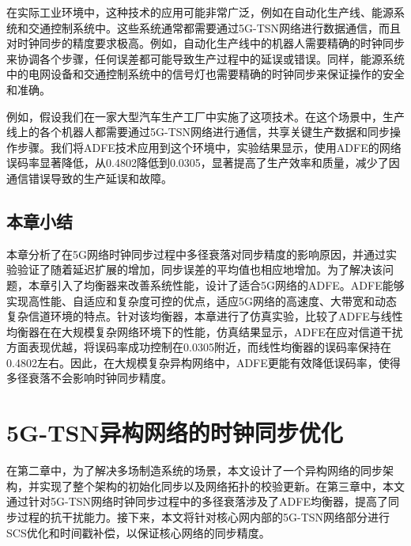 \documentclass[UTF8,a4paper,12pt]{ctexart}
\numberwithin{equation}{section}
\begin{document}
在实际工业环境中，这种技术的应用可能非常广泛，例如在自动化生产线、能源系统和交通控制系统中。这些系统通常都需要通过5G-TSN网络进行数据通信，而且对时钟同步的精度要求极高。例如，自动化生产线中的机器人需要精确的时钟同步来协调各个步骤，任何误差都可能导致生产过程中的延误或错误。同样，能源系统中的电网设备和交通控制系统中的信号灯也需要精确的时钟同步来保证操作的安全和准确。

例如，假设我们在一家大型汽车生产工厂中实施了这项技术。在这个场景中，生产线上的各个机器人都需要通过5G-TSN网络进行通信，共享关键生产数据和同步操作步骤。我们将ADFE技术应用到这个环境中，实验结果显示，使用ADFE的网络误码率显著降低，从0.4802降低到0.0305，显著提高了生产效率和质量，减少了因通信错误导致的生产延误和故障。


\subsection{本章小结}
本章分析了在5G网络时钟同步过程中多径衰落对同步精度的影响原因，并通过实验验证了随着延迟扩展的增加，同步误差的平均值也相应地增加。为了解决该问题，本章引入了均衡器来改善系统性能，设计了适合5G网络的ADFE。ADFE能够实现高性能、自适应和复杂度可控的优点，适应5G网络的高速度、大带宽和动态复杂信道环境的特点。针对该均衡器，本章进行了仿真实验，比较了ADFE与线性均衡器在在大规模复杂网络环境下的性能，仿真结果显示，ADFE在应对信道干扰方面表现优越，将误码率成功控制在0.0305附近，而线性均衡器的误码率保持在0.4802左右。因此，在大规模复杂异构网络中，ADFE更能有效降低误码率，使得多径衰落不会影响时钟同步精度。
\newpage
{}
\section{5G-TSN异构网络的时钟同步优化}
在第二章中，为了解决多场制造系统的场景，本文设计了一个异构网络的同步架构，并实现了整个架构的初始化同步以及网络拓扑的校验更新。在第三章中，本文通过针对5G-TSN网络时钟同步过程中的多径衰落涉及了ADFE均衡器，提高了同步过程的抗干扰能力。接下来，本文将针对核心网内部的5G-TSN网络部分进行SCS优化和时间戳补偿，以保证核心网络的同步精度。
\end{document}
